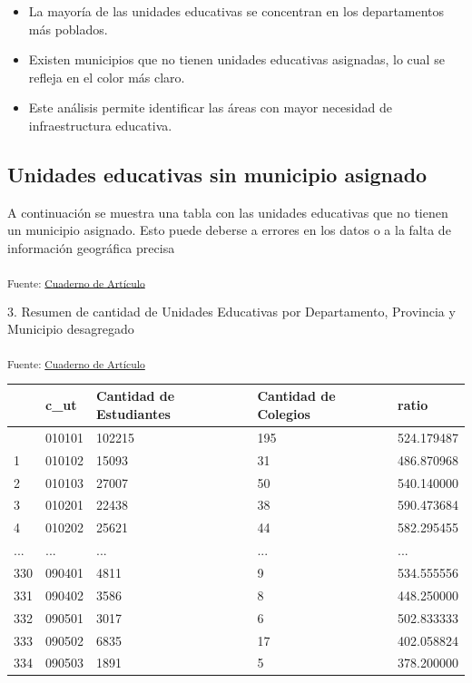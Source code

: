 \documentclass[
  12pt]{article}
\providecommand{\tightlist}{%
  \setlength{\itemsep}{0pt}\setlength{\parskip}{0pt}}\usepackage{longtable,booktabs,array}
\begin{document}
\begin{itemize}
\tightlist
\item
  La mayoría de las unidades educativas se concentran en los
  departamentos más poblados.
\item
  Existen municipios que no tienen unidades educativas asignadas, lo
  cual se refleja en el color más claro.
\item
  Este análisis permite identificar las áreas con mayor necesidad de
  infraestructura educativa.
\end{itemize}

\subsection{Unidades educativas sin municipio
asignado}\label{unidades-educativas-sin-municipio-asignado}

A continuación se muestra una tabla con las unidades educativas que no
tienen un municipio asignado. Esto puede deberse a errores en los datos
o a la falta de información geográfica precisa

\textsubscript{Fuente:
\href{https://sociest.github.io/ue-report/index.ipynb.html}{Cuaderno de
Artículo}}

3. Resumen de cantidad de Unidades Educativas por Departamento,
Provincia y Municipio desagregado

\textsubscript{Fuente:
\href{https://sociest.github.io/ue-report/index.ipynb.html}{Cuaderno de
Artículo}}

\begin{longtable}[]{@{}lllll@{}}
\toprule\noalign{}
& c\_ut & Cantidad de Estudiantes & Cantidad de Colegios & ratio \\
\midrule\noalign{}
\endhead
\bottomrule\noalign{}
\endlastfoot
0 & 010101 & 102215 & 195 & 524.179487 \\
1 & 010102 & 15093 & 31 & 486.870968 \\
2 & 010103 & 27007 & 50 & 540.140000 \\
3 & 010201 & 22438 & 38 & 590.473684 \\
4 & 010202 & 25621 & 44 & 582.295455 \\
... & ... & ... & ... & ... \\
330 & 090401 & 4811 & 9 & 534.555556 \\
331 & 090402 & 3586 & 8 & 448.250000 \\
332 & 090501 & 3017 & 6 & 502.833333 \\
333 & 090502 & 6835 & 17 & 402.058824 \\
334 & 090503 & 1891 & 5 & 378.200000 \\
\end{longtable}
\end{document}
